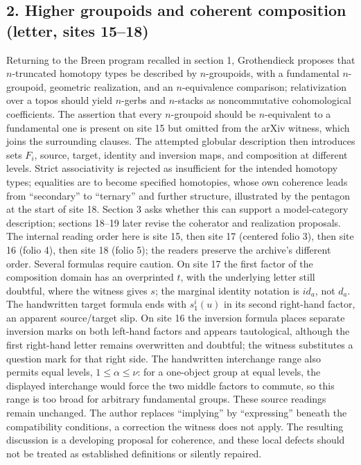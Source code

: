 \documentclass[10pt,oneside]{book}
\begin{document}
\subsection*{2. Higher groupoids and coherent composition (letter, sites 15--18)}
Returning to the Breen program recalled in section 1, Grothendieck proposes that $n$-truncated homotopy types be described by $n$-groupoids, with a fundamental $n$-groupoid, geometric realization, and an $n$-equivalence comparison; relativization over a topos should yield $n$-gerbs and $n$-stacks as noncommutative cohomological coefficients. The assertion that every $n$-groupoid should be $n$-equivalent to a fundamental one is present on site 15 but omitted from the arXiv witness, which joins the surrounding clauses. The attempted globular description then introduces sets $F_i$, source, target, identity and inversion maps, and composition at different levels. Strict associativity is rejected as insufficient for the intended homotopy types; equalities are to become specified homotopies, whose own coherence leads from ``secondary'' to ``ternary'' and further structure, illustrated by the pentagon at the start of site 18. Section 3 asks whether this can support a model-category description; sections 18--19 later revise the coherator and realization proposals. The internal reading order here is site 15, then site 17 (centered folio 3), then site 16 (folio 4), then site 18 (folio 5); the readers preserve the archive's different order. Several formulas require caution. On site 17 the first factor of the composition domain has an overprinted $t$, with the underlying letter still doubtful, where the witness gives $s$; the marginal identity notation is $id_a$, not $d_a$. The handwritten target formula ends with $s^i_1(u)$ in its second right-hand factor, an apparent source/target slip. On site 16 the inversion formula places separate inversion marks on both left-hand factors and appears tautological, although the first right-hand letter remains overwritten and doubtful; the witness substitutes a question mark for that right side. The handwritten interchange range also permits equal levels, $1\leq\alpha\leq\nu$: for a one-object group at equal levels, the displayed interchange would force the two middle factors to commute, so this range is too broad for arbitrary fundamental groups. These source readings remain unchanged. The author replaces ``implying'' by ``expressing'' beneath the compatibility conditions, a correction the witness does not apply. The resulting discussion is a developing proposal for coherence, and these local defects should not be treated as established definitions or silently repaired.
\end{document}
